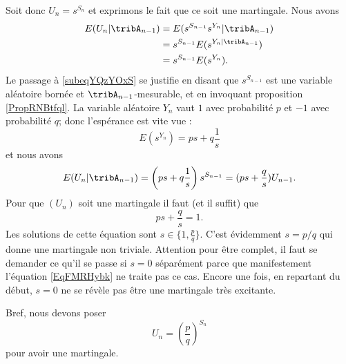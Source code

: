 Soit donc \( U_n=s^{S_n}\) et exprimons le fait que ce soit une martingale. Nous avons
\begin{subequations}
    \begin{align}
        E(U_n|\tribA_{n-1})&=E(s^{S_{n-1}}s^{Y_n}|\tribA_{n-1})\\
        &=s^{S_{n-1}}E(s^{Y_n|\tribA_{n-1}})    \label{subeqYQzYOxS}\\
        &=s^{S_{n-1}}E(s^{Y_n}).
    \end{align}
\end{subequations}
Le passage à \eqref{subeqYQzYOxS} se justifie en disant que \( s^{S_{n-1}}\) est une variable aléatoire bornée et \( \tribA_{n-1}\)-mesurable, et en invoquant proposition \ref{PropRNBtfql}. La variable aléatoire \( Y_n\) vaut \( 1\) avec probabilité \( p\) et \( -1\) avec probabilité \( q\); donc l'espérance est vite vue :
\begin{equation}
    E(s^{Y_n})=ps+q\frac{1}{ s }
\end{equation}
et nous avons
\begin{equation}
    E(U_n|\tribA_{n-1})=\left( ps+q\frac{1}{ s } \right)s^{S_{n-1}}=(ps+\frac{ q }{ s })U_{n-1}.
\end{equation}
Pour que \( (U_n)\) soit une martingale il faut (et il suffit) que
\begin{equation}    \label{EqFMRHybk}
    ps+\frac{ q }{ s }=1.
\end{equation}
Les solutions de cette équation sont \( s\in\{ 1,\frac{ p }{ q } \}\). C'est évidemment \( s=p/q\) qui donne une martingale non triviale. Attention pour être complet, il faut se demander ce qu'il se passe si \( s=0\) séparément parce que manifestement l'équation \eqref{EqFMRHybk} ne traite pas ce cas. Encore une fois, en repartant du début, \( s=0\) ne se révèle pas être une martingale très excitante.

Bref, nous devons poser 
\begin{equation}
    U_n=\left( \frac{ p }{ q } \right)^{S_n}
\end{equation}
pour avoir une martingale.
